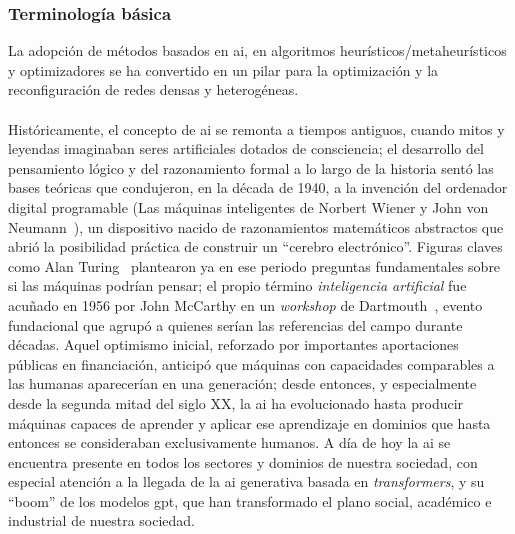 \subsubsection{Terminología básica}
\label{subsubsec:terminologiaModelos}

La adopción de métodos basados en \gls{ai}, en algoritmos heurísticos/metaheurísticos y optimizadores se ha convertido en un pilar para la optimización y la reconfiguración de redes densas y heterogéneas.\\
\\
Históricamente, el concepto de \gls{ai} se remonta a tiempos antiguos, cuando mitos y leyendas imaginaban seres artificiales dotados de consciencia; el desarrollo del pensamiento lógico y del razonamiento formal a lo largo de la historia sentó las bases teóricas que condujeron, en la década de 1940, a la invención del ordenador digital programable (Las máquinas inteligentes de Norbert Wiener y John von Neumann~\cite{heims1981john}), un dispositivo nacido de razonamientos matemáticos abstractos que abrió la posibilidad práctica de construir un ``cerebro electrónico''. Figuras claves como Alan Turing~\cite{shanker1995turing} plantearon ya en ese periodo preguntas fundamentales sobre si las máquinas podrían pensar; el propio término \textit{inteligencia artificial} fue acuñado en 1956 por John McCarthy en un \textit{workshop} de Dartmouth~\cite{mccarthy1956dartmouth}, evento fundacional que agrupó a quienes serían las referencias del campo durante décadas. Aquel optimismo inicial, reforzado por importantes aportaciones públicas en financiación, anticipó que máquinas con capacidades comparables a las humanas aparecerían en una generación; desde entonces, y especialmente desde la segunda mitad del siglo XX, la \gls{ai} ha evolucionado hasta producir máquinas capaces de aprender y aplicar ese aprendizaje en dominios que hasta entonces se consideraban exclusivamente humanos. A día de hoy la \gls{ai} se encuentra presente en todos los sectores y dominios de nuestra sociedad, con especial atención a la llegada de la \gls{ai} generativa basada en \textit{transformers}, y su ``boom'' de los modelos \gls{gpt}, que han transformado el plano social, académico e industrial de nuestra sociedad.\\
\\
